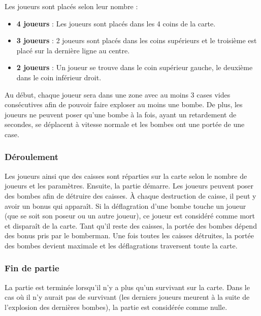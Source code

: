 \vspace{0.5cm}

Les joueurs sont placés selon leur nombre : 
\begin{itemize}
\item \textbf{4 joueurs} : Les joueurs sont placés dans les 4 coins de la carte.
\item \textbf{3 joueurs} : 2 joueurs sont placés dans les coins supérieurs et le troisième est placé sur la dernière ligne au centre.
\item \textbf{2 joueurs} : Un joueur se trouve dans le coin supérieur gauche, le deuxième dans le coin inférieur droit.
\end{itemize}

\vspace{0.5cm}

Au début, chaque joueur sera dans une zone avec au moins 3 cases vides consécutives afin de pouvoir faire exploser au moins une bombe. De plus, les joueurs ne peuvent poser qu'une bombe à la fois, ayant un retardement de \longueurMeche secondes, se déplacent à vitesse normale et les bombes ont une portée de une case.

\subsubsection{Déroulement}

Les joueurs ainsi que des caisses sont réparties sur la carte selon le nombre de joueurs et les paramètres. Ensuite, la partie démarre. Les joueurs peuvent poser des bombes afin de détruire des caisses. À chaque destruction de caisse, il peut y avoir un bonus qui apparaît. Si la déflagration d'une bombe touche un joueur (que se soit son poseur ou un autre joueur), ce joueur est considéré comme mort et disparaît de la carte. Tant qu'il reste des caisses, la portée des bombes dépend des bonus pris par le bomberman. Une fois toutes les caisses détruites, la portée des bombes devient maximale et les déflagrations traversent toute la carte.

\subsubsection{Fin de partie}

La partie est terminée lorsqu'il n'y a plus qu'un survivant sur la carte. Dans le cas où il n'y aurait pas de survivant (les derniers joueurs meurent à la suite de l'explosion des dernières bombes), la partie est considérée comme nulle.

